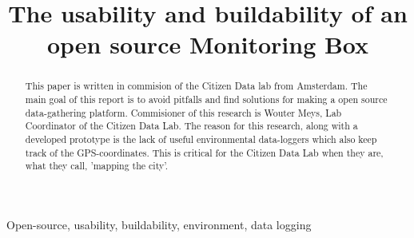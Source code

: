 \documentclass[conference]{IEEEtran}
\begin{document}
\title{The usability and buildability of an open source Monitoring Box}

\author{
	\and
		\and
		}
	

\maketitle



\begin{abstract}
This paper is written in commision of the Citizen Data lab from Amsterdam. The main goal of this report is to avoid pitfalls and find solutions for making a open source data-gathering platform. Commisioner of this research is Wouter Meys, Lab Coordinator of the Citizen Data Lab. The reason for this research, along with a developed prototype is the lack of useful environmental data-loggers which also keep track of the GPS-coordinates. This is critical for the Citizen Data Lab when they are, what they call, 'mapping the city'. \\

\end{abstract}

\begin{IEEEkeywords}
Open-source, usability, buildability, environment, data logging
\end{IEEEkeywords}
\end{document}
